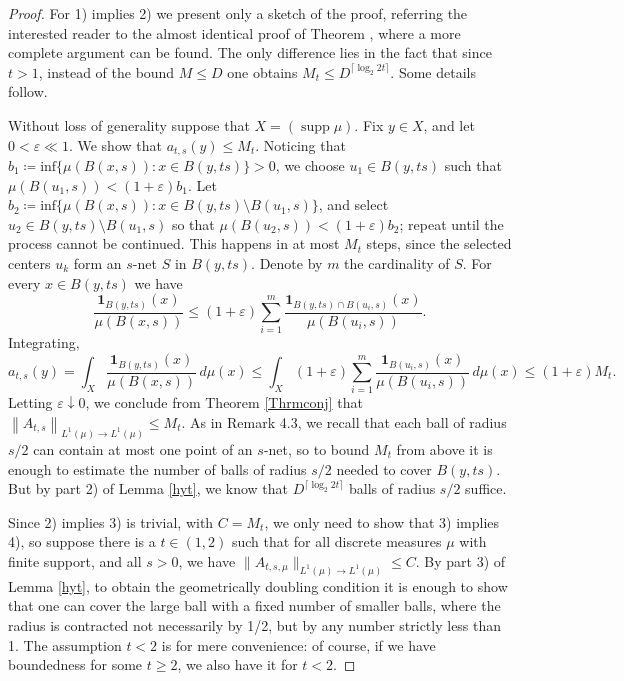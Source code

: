 \documentclass[12pt]{amsart}
\theoremstyle{definition}
\theoremstyle{parrafo}
\begin{document}
 \begin{proof} For 1) implies 2)  we present only a sketch of the proof,  referring the interested reader to the almost identical proof of 
 Theorem \cite[3.5]{Al1}, where a more complete argument can be found. The only difference lies in the fact that since $t > 1$, instead of the bound
 $M \le D$ one obtains $M_t \le D^{\lceil \log_2 2 t \rceil}$. Some details follow. 

Without loss of generality suppose that $X = (\operatorname{supp}\mu)$.  Fix  $y \in X$, and let $0 < \varepsilon \ll  1$. We show that $a_{t,s}(y) \leq M_t$.
Noticing that  $b_1 \coloneqq \text{inf}\{  \mu (B(x,s))  : x \in B(y, ts)\} > 0$, we choose $u_1 \in B(y,ts)$ such that $\mu (B(u_1,s )) < (1 + \varepsilon)b_1$. Let $b_2 \coloneqq \text{inf}\{  \mu (B(x,s))  : x \in B(y,ts)\setminus B(u_1,s) \} $, and select $u_2 \in B(y,ts)\setminus B(u_1,s)$ so that $\mu (B(u_2,s)) < (1 + \varepsilon)b_2$; repeat until the process cannot be continued. This happens in   at most $M_t$ steps, since the selected centers $u_k$ form an $s$-net $S$ in $B(y, ts)$. Denote by $m$ the cardinality of $S$.
	For every $x \in B(y,ts)$ we have
	$$
	\frac{\mathbf{1}_{B(y,ts)}(x)}{\mu (B(x,s))} 
	\leq 
	(1+\varepsilon) \sum_{i=1}^{m} \frac{\mathbf{1}_{B(y,ts)\cap B(u_i,s)}(x)}{\mu (B(u_i,s))}.
	$$
	Integrating,
	$$
	a_{t,s}(y) = \int_{X} 	\frac{\mathbf{1}_{B(y,ts)}(x)}{\mu (B(x,s))} \hspace{2pt}d\mu (x)
	 \leq 
	\int_{X} (1+\varepsilon) \sum_{i=1}^{m} \frac{\mathbf{1}_{ B(u_i,s )}(x)}{\mu (B(u_i,s))} \hspace{2pt}d\mu (x) \leq (1+\varepsilon)M_t.
	$$
Letting $\varepsilon \downarrow 0$, we conclude from Theorem \ref{Thrmconj}  that $\left \|  A_{t,s}\right \|_{L^1(\mu) \rightarrow L^1(\mu)} \leq M_t$.
As in Remark 4.3, we recall that each ball of radius $s/2$ can contain at most one point of an $s$-net, so to bound 
$M_t$ from above it is enough to estimate the number of balls of radius $s/2$ needed to cover $B(y, ts)$. But by part 2) of Lemma \ref{hyt}, we know that $D^{\lceil \log_2 2 t \rceil}$ balls of radius $s/2$ suffice.
 
 Since 2) implies 3) is
 trivial, with $C = M_t$, we only need to show that 3) implies 4), so suppose there is a $t \in (1,2) $
 such that for all discrete measures $\mu$ with finite support, and all $s > 0$, we have $\|A_{t, s, \mu} \|_{L^1(\mu)\to L^1(\mu)} \le C$. By part 3) of Lemma \ref{hyt}, to obtain the geometrically doubling condition it is enough to show that one can cover the large ball with a fixed number of smaller balls, where the radius is contracted not necessarily by 1/2, but by any number strictly less than 1. The assumption $t < 2$ is for mere convenience: of course, if we have boundedness for some $t \ge 2$, we also have it for $t < 2$. 
 

\end{proof}
\end{document}

